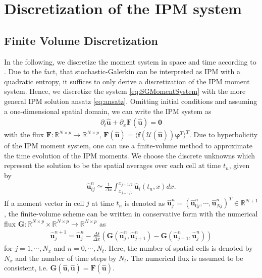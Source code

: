 \section{Discretization of the IPM system}
\label{sec:framework}
\subsection{Finite Volume Discretization}
In the following, we discretize the moment system in space and time according to \cite{kusch2017maximum}. Due to the fact, that stochastic-Galerkin can be interpreted as IPM with a quadratic entropy, it suffices to only derive a discretization of the IPM moment system. Hence, we discretize the system \eqref{eq:SGMomentSystem} with the more general IPM solution ansatz \eqref{eq:ansatz}.  
Omitting initial conditions and assuming a one-dimensional spatial domain, we can write the IPM system  as
\begin{align*}
\partial_t \bm{\hat u}+\partial_x \bm{F}(\bm{\hat u}) = \bm{0}
\end{align*}
with the flux $\bm{F}:\mathbb{R}^{N\times p}\to\mathbb{R}^{N\times p}$, $\bm{F}(\bm{\hat u})=\langle \bm f(\mathcal{U}(\bm{\hat u}))\bm{\varphi}^T \rangle^T$. Due to hyperbolicity of the IPM moment system, one can use a finite-volume method to approximate the time evolution of the IPM moments. We choose the discrete unknowns which represent the solution to be the spatial averages over each cell at time $t_n$, given by
\begin{align*}
\bm{\hat u}_{ij}^n \simeq \frac{1}{\Delta x}\int_{x_{j-1/ 2}}^{x_{j+1/ 2}}\bm{\hat u}_i(t_n,x) dx.
\end{align*}
If a moment vector in cell $j$ at time $t_n$ is denoted as $\bm{\hat u}_j^n = (\bm{\hat u}_{0j}^n,\cdots,\bm{\hat u}_{Nj}^n)^T\in\mathbb{R}^{N+1}$, the finite-volume scheme can be written in conservative form with the numerical flux $\bm{G}:\mathbb{R}^{N\times p}\times\mathbb{R}^{N\times p}\to\mathbb{R}^{N\times p}$ as
\begin{align}\label{eq:IPMDiscretization}
\bm{\hat u}_{j}^{n+1} = \bm{\hat u}_{j}^{n}  - \frac{\Delta t}{\Delta x}\left( \bm{G}(\bm{\hat u}_{j}^{n},\bm{\hat u}_{j+1}^{n})- \bm{G}(\bm{\hat u}_{j-1}^{n},\bm{\hat u}_{j}^{n})\right)
\end{align}
for $j = 1,\cdots,N_x$ and $n = 0,\cdots,N_t$. Here, the number of spatial cells is denoted by $N_x$ and the number of time steps by $N_t$.
The numerical flux is assumed to be consistent, i.e. $\bm{G}(\bm{\hat{u}},\bm{\hat{u}})=\bm{F}(\bm{\hat{u}})$.

